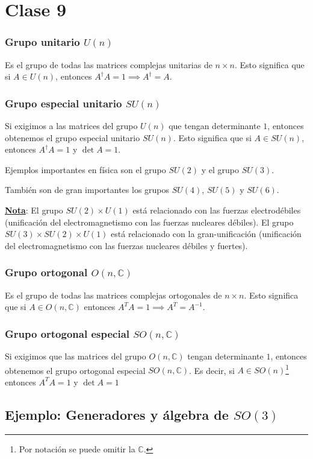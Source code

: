 \section{Clase 9}
\subsubsection{Grupo unitario $U(n)$}
Es el grupo de todas las matrices complejas unitarias de $n\times n$. Esto significa que si $A\in U(n)$, entonces $A^\dagger A=1\implies A^\dagger=A$.

\subsubsection{Grupo especial unitario $SU(n)$}
Si exigimos a las matrices del grupo $U(n)$ que tengan determinante $1$, entonces obtenemos el grupo especial unitario $SU(n)$. Esto significa que si $A\in SU(n)$, entonces $A^\dagger A=1$ y $\det A=1$.

Ejemplos importantes en física son el grupo $SU(2)$ y el grupo $SU(3)$.

También son de gran importantes los grupos $SU(4)$, $SU(5)$ y $SU(6)$.

\underline{\textbf{Nota}}: El grupo $SU(2)\times U(1)$ está relacionado con las fuerzas electrodébiles (unificación del electromagnetismo con las fuerzas nucleares débiles). El grupo $SU(3)\times SU(2)\times U(1)$ está relacionado con la gran-unificación (unificación del electromagnetismo con las fuerzas nucleares débiles y fuertes).

\subsubsection{Grupo ortogonal $O(n,\mathbb{C})$}
Es el grupo de todas las matrices complejas ortogonales de $n\times n$. Esto significa que si $A\in O(n,\mathbb{C})$ entonces $A^TA=1\implies A^T=A^{-1}$.

\subsubsection{Grupo ortogonal especial $SO(n,\mathbb{C})$}
Si exigimos que las matrices del grupo $O(n,\mathbb{C})$ tengan determinante $1$, entonces obtenemos el grupo ortogonal especial $SO(n,\mathbb{C})$. Es decir, si $A\in SO(n)$\footnote{Por notación se puede omitir la $\mathbb{C}$.} entonces $A^TA=1$ y $\det A=1$

\subsection{Ejemplo: Generadores y álgebra de $SO(3)$}

